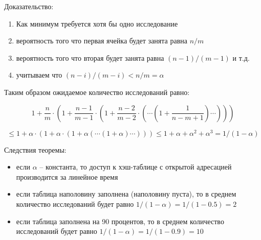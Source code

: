 \documentclass[a4paper,11pt]{article}
\begin{document}
Доказательство:

\begin{enumerate}
\item Как минимум требуется хотя бы одно исследование
\item вероятность того что первая ячейка будет занята равна $n/m$
\item вероятность того что вторая будет занята равна $(n-1)/(m-1)$ и т.д.
\item учитываем что $(n - i)/(m - i) < n/m = \alpha $
\end{enumerate}

Таким образом ожидаемое количество исследований равно:

$$
1 + \frac{n}{m} \cdot (1 + \frac{n-1}{m-1} \cdot (1 + \frac{n-2}{m-2} \cdot ( \cdots (1 +
\frac{1}{n-m+1}) \cdots)))
$$

$$
\leq 1 + \alpha \cdot (1 + \alpha \cdot (1 + \alpha(\cdots (1
+ \alpha) \cdots ))) \leq 1 + \alpha + \alpha^2 + \alpha^3 = 1/(1-\alpha)
$$

Следствия теоремы:

\begin{itemize}
\item если $\alpha$ -- константа, то доступ к хэш-таблице с открытой адресацией
  производится за линейное время
\item если таблица наполовину заполнена (наполовину пуста), то в среднем
  количество исследований будет равно $1 / (1 - \alpha) = 1 / (1 - 0.5) = 2$
\item если таблица заполнена на 90 процентов, то в среднем
  количество исследований будет равно $1 / (1 - \alpha) = 1 / (1 - 0.9) = 10$
\end{itemize}
\end{document}
